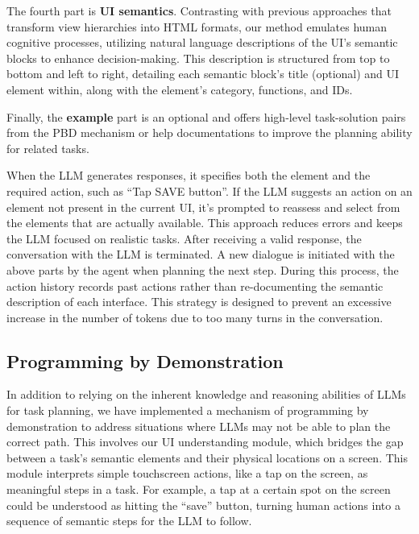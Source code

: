 The fourth part is \textbf{UI semantics}. Contrasting with previous approaches that transform view hierarchies into HTML formats, our method emulates human cognitive processes, utilizing natural language descriptions of the UI’s semantic blocks to enhance decision-making. This description is structured from top to bottom and left to right, detailing each semantic block's title (optional) and UI element within, along with the element's category, functions, and IDs. 

Finally, the \textbf{example} part is an optional and offers high-level task-solution pairs from the PBD mechanism or help documentations to improve the planning ability for related tasks.

When the LLM generates responses, it specifies both the element and the required action, such as ``Tap SAVE button''. If the LLM suggests an action on an element not present in the current UI, it's prompted to reassess and select from the elements that are actually available. This approach reduces errors and keeps the LLM focused on realistic tasks. After receiving a valid response, the conversation with the LLM is terminated. A new dialogue is initiated with the above parts by the agent when planning the next step. During this process, the action history records past actions rather than re-documenting the semantic description of each interface. This strategy is designed to prevent an excessive increase in the number of tokens due to too many turns in the conversation.

\subsection{Programming by Demonstration}
\label{sec:pbd}
In addition to relying on the inherent knowledge and reasoning abilities of LLMs for task planning, we have implemented a mechanism of programming by demonstration to address situations where LLMs may not be able to plan the correct path. This involves our UI understanding module, which bridges the gap between a task's semantic elements and their physical locations on a screen. This module interprets simple touchscreen actions, like a tap on the screen, as meaningful steps in a task. For example, a tap at a certain spot on the screen could be understood as hitting the ``save'' button, turning human actions into a sequence of semantic steps for the LLM to follow.

